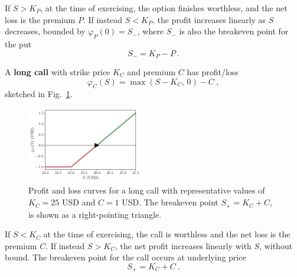 \documentclass[aps,reprint]{revtex4-2}
\begin{document}
If $S > K_P$, at the time of exercising, the option finishes worthless,  and the net loss is the premium $P$. If instead $S<K_P$, the profit increases linearly as $S$ decreases, bounded by $\varphi_P(0) = S_-$, where 
$S_-$ is also the breakeven point for the put
\begin{equation}
S_- = K_P - P~.
\end{equation}


A \textbf{long call} with strike price $K_C$ and premium $C$ has profit/loss 
\begin{equation}
\varphi_C(S) = \max(S - K_C,\,0) - C~,
\end{equation}
sketched in Fig.~\ref{fig:call}.
\begin{figure}[hb]
    \centering
    \includegraphics[width=0.45\textwidth]{figs/call.pdf}
    \caption{Profit and loss curves for a long call with representative values of $K_C = 25$ USD and $C = 1$ USD.  The breakeven point $S_+ = K_C + C$, is shown as a right-pointing triangle.
    }
    \label{fig:call}
\end{figure}

If $S < K_C$ at the time of exercising, the call is worthless and the net loss is the premium $C$. If instead $S>K_C$, the net profit increases
linearly with $S$, without bound. The breakeven point for the call occurs at underlying price
\begin{equation}
S_+ = K_C + C~.
\end{equation}
\end{document}
